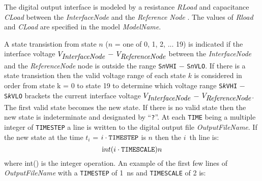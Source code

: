 
The digital output interface is modeled by a resistance {\it RLoad}
and capacitance {\it CLoad} between
the {\it InterfaceNode} and the {\it Reference Node }.
The values of {\it Rload} and {\it CLoad} are specified in the model
{\it ModelName}.

A state transistion from state $n$ ($n$ = one of 0, 1, 2, ... 19) is indicated
if the interface voltage
$V_{\mbox{\it InterfaceNode}}$ $-$ $V_{\mbox{\it ReferenceNode}}$
between the {\it InterfaceNode} and the
{\it ReferenceNode} node is outside the range
{\tt S{\it n}VHI} $-$ {\tt S{\it n}VLO}.
If there is a state transistion then the valid voltage range of each state
$k$ is considered in order from state k =  0 to state 19 to determine
which voltage range
{\tt S{\it k}VHI} $-$ {\tt S{\it k}VLO} brackets the current interface
voltage
$V_{\mbox{\it InterfaceNode}}$ $-$ $V_{\mbox{\it ReferenceNode}}$.
The first valid state becomes the new state.  If there is no valid state
then the new state is indeterminate and designated by ``{\tt ?}''.
At each {\tt TIME} being a multiple integer of {\tt TIMESTEP}
a line is written to the
digital output file {\it OutputFileName}.
If the new state at the time $t_i$ = $i \cdot {\tt TIMESTEP}$ is $n$ then
the $i$~th line is:
\begin{equation*}
{{\textrm int}(i \cdot {\tt TIMESCALE})  n}
\end{equation*}
where int() is the integer operation.
An example of the first few lines of {\it OutputFileName} with a
{\tt TIMESTEP} of 1~ns and {\tt TIMESCALE} of 2 is:
\rm

